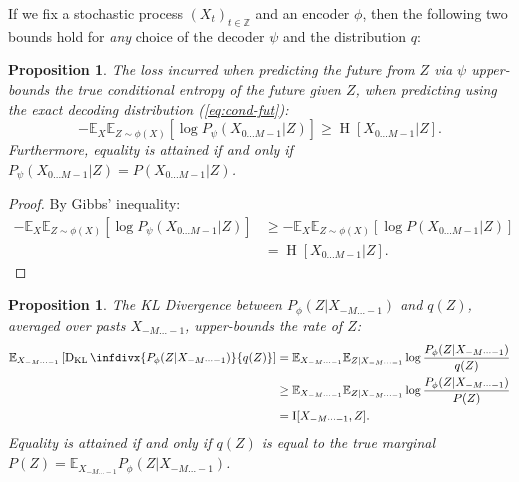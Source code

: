 \documentclass[entropy,article,submit,moreauthors,pdftex,10pt,a4paper]{Definitions/mdpi}
\newcommand{\E}[0]{\mathbb{E}}
\newcounter{theorem}
\newtheorem{proposition}[theorem]{Proposition}
\newcommand{\finitefuture}{X_{0\dots M-1}}
\begin{document}
If we fix a stochastic process $(X_t)_{t \in \mathbb{Z}}$ and an encoder $\phi$, then the following two bounds hold for \emph{any} choice of the decoder $\psi$ and the distribution $q$:

\begin{proposition}
The loss incurred when predicting the future from $Z$ via $\psi$ upper-bounds the true conditional entropy of the future given $Z$, when predicting using the exact decoding distribution (\ref{eq:cond-fut}):
\begin{equation}\label{ineq1}
	-	\mathbb{E}_{X}\mathbb{E}_{Z \sim \phi(X)}\left[\log P_\psi(\finitefuture | Z)\right] \geq \operatorname{H}[\finitefuture|Z].
\end{equation}
Furthermore, equality is attained if and only if $P_\psi(\finitefuture|Z) = P(\finitefuture|Z)$. %
\end{proposition}

\begin{proof}
By Gibbs' inequality:
\begin{align*}
	-	\mathbb{E}_{X}\mathbb{E}_{Z \sim \phi(X)}\left[\log P_\psi(\finitefuture | Z)\right] & \geq -	\mathbb{E}_{X}\mathbb{E}_{Z \sim \phi(X)}\left[\log P(\finitefuture | Z)\right]\\
	&= \operatorname{H}[\finitefuture|Z].
\end{align*}
\end{proof}

\begin{proposition} 
The KL Divergence between $P_\phi(Z|X_{-M\dots-1})$ and $q(Z)$, averaged over pasts $X_{-M\dots-1}$, upper-bounds the rate of $Z$: %
\begin{equation}\label{ineq2}
\begin{aligned}
	\mathbb{E}_{X_{-M\dots-1}}\left[ \operatorname{D_{KL}}\infdivx{P_\phi(Z|X_{-M\dots-1})}{q(Z)}\right] &=   \mathbb{E}_{X_{-M\dots-1}} \mathbb{E}_{Z|X_{-M\dots-1}} \log \frac{P_\phi(Z|X_{-M\dots -1})}{q(Z)}  \\
	& \geq  \mathbb{E}_{X_{-M\dots-1}} \mathbb{E}_{Z|X_{-M\dots-1}} \log \frac{P_\phi(Z|X_{-M\dots -1})}{P(Z)}  \\
	& = \operatorname{I}[X_{-M\dots -1},Z].
\end{aligned}
\end{equation}
Equality is attained if and only if $q(Z)$ is equal to the true marginal $P(Z) = \E_{X_{-M \dots -1}} P_\phi(Z|X_{-M \dots -1})$.
\end{proposition}
\end{document}
